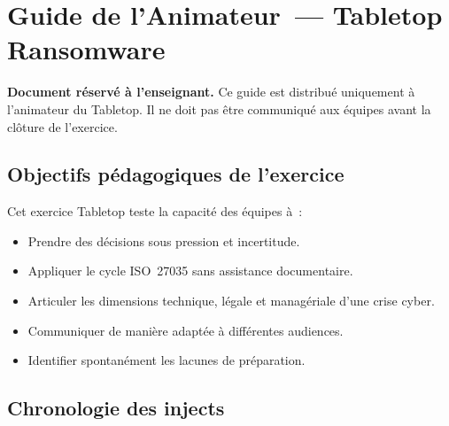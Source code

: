 
\chapter*{Guide de l'Animateur~— Tabletop Ransomware}
\label{ann:tabletop}

\begin{boxinfo}
\textbf{Document réservé à l'enseignant.} Ce guide est distribué uniquement
à l'animateur du Tabletop. Il ne doit pas être communiqué aux équipes avant
la clôture de l'exercice.
\end{boxinfo}

\section*{Objectifs pédagogiques de l'exercice}

Cet exercice Tabletop teste la capacité des équipes à~:
\begin{itemize}
  \item Prendre des décisions sous pression et incertitude.
  \item Appliquer le cycle ISO~27035 sans assistance documentaire.
  \item Articuler les dimensions technique, légale et managériale
        d'une crise cyber.
  \item Communiquer de manière adaptée à différentes audiences.
  \item Identifier spontanément les lacunes de préparation.
\end{itemize}

\section*{Chronologie des injects}

